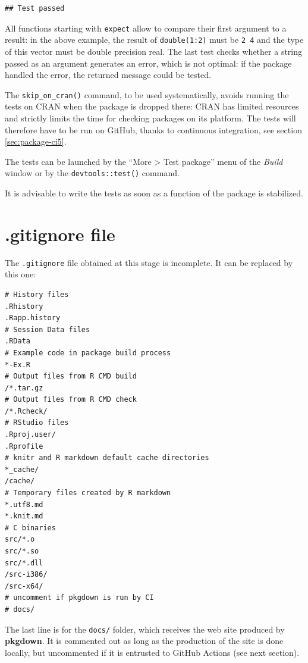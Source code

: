 \documentclass[
  12pt,
  american,
  a4paper,
  extrafontsizes,onecolumn,openright
  ]{memoir}
\begin{document}
\begin{verbatim}
## Test passed
\end{verbatim}

\normalsize

All functions starting with \texttt{expect} allow to compare their first argument to a result: in the above example, the result of \texttt{double(1:2)} must be \texttt{2\ 4} and the type of this vector must be double precision real.
The last test checks whether a string passed as an argument generates an error, which is not optimal: if the package handled the error, the returned message could be tested.

The \texttt{skip\_on\_cran()} command, to be used systematically, avoids running the tests on CRAN when the package is dropped there: CRAN has limited resources and strictly limits the time for checking packages on its platform.
The tests will therefore have to be run on GitHub, thanks to continuous integration, see section \ref{sec:package-ci5}.

The tests can be launched by the \enquote{More \textgreater{} Test package} menu of the \emph{Build} window or by the \texttt{devtools::test()} command.

It is advisable to write the tests as soon as a function of the package is stabilized.

\section{.gitignore file}\label{gitignore-file}

The \texttt{.gitignore} file obtained at this stage is incomplete.
It can be replaced by this one:

\begin{verbatim}
# History files
.Rhistory
.Rapp.history
# Session Data files
.RData
# Example code in package build process
*-Ex.R
# Output files from R CMD build
/*.tar.gz
# Output files from R CMD check
/*.Rcheck/
# RStudio files
.Rproj.user/
.Rprofile
# knitr and R markdown default cache directories
*_cache/
/cache/
# Temporary files created by R markdown
*.utf8.md
*.knit.md
# C binaries
src/*.o
src/*.so
src/*.dll
/src-i386/
/src-x64/
# uncomment if pkgdown is run by CI
# docs/
\end{verbatim}

The last line is for the \texttt{docs/} folder, which receives the web site produced by \textbf{pkgdown}.
It is commented out as long as the production of the site is done locally, but uncommented if it is entrusted to GitHub Actions (see next section).
\end{document}
